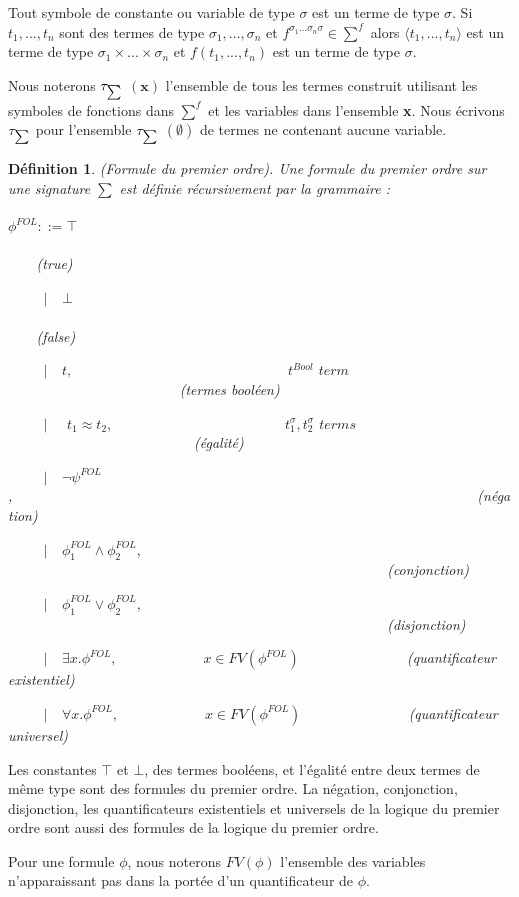 \documentclass[11pt,openany]{article}
\newtheorem{definition}{D\'efinition}[subsection]
\begin{document}
	Tout symbole de constante ou variable de type $\sigma$ est un terme de type $\sigma$. Si $t_{1},...,t_{n}$ sont des termes de type $\sigma_{1},...,\sigma_{n}$ et $f^{\sigma_{1} ...\sigma_{n} \sigma} \in \sum^{f}$ alors $\langle t_{1},...,t_{n}\rangle$ est un terme de type $\sigma_{1} \times ... \times \sigma_{n}$ et $f(t_{1},...,t_{n})$ est un terme de type $\sigma$.\par

Nous noterons $\tau_{\mathsmaller\sum}$ $(\textbf{x})$ l'ensemble de tous les termes construit utilisant les symboles de fonctions dans $\sum^{f}$ et les variables dans l'ensemble \textbf{x}. Nous \'ecrivons $\tau_{\mathsmaller\sum}$ pour l'ensemble $\tau_{\mathsmaller\sum}$ $(\emptyset)$ de termes ne contenant aucune variable.
\begin{definition} 
(Formule du premier ordre). Une formule du premier ordre sur une signature $\sum$ est d\'efinie r\'ecursivement par la grammaire :\\
\\$\phi^{FOL} ::= \top$~~~~~~~~~~~~~~~~~~~~~~~~~~~~~~~~~~~~~~~~~~~~~~~~~~~~~~~~~~~~~~~~~~~~~~~~~~(true)\par
~~~~~$|$~~$\bot$~~~~~~~~~~~~~~~~~~~~~~~~~~~~~~~~~~~~~~~~~~~~~~~~~~~~~~~~~~~~~~~~~~~~~~~~~~(false)
\par
~~~~~$|$~~$t,$~~~~~~~~~~~~~~~~~~~~~~~~~~~~~~$t^{Bool}$ $term$~~~~~~~~~~~~~~~~~~~~~~~~(termes bool\'een)\par
~~~~~$|$~~ $t_{1} \approx t_{2},$~~~~~~~~~~~~~~~~~~~~~~~~$t_{1}^{\sigma},t_{2}^{\sigma}$ $terms$~~~~~~~~~~~~~~~~~~~~~~~~~~(\'egalit\'e)\par
~~~~~$|$~~$\neg\psi^{FOL}$,~~~~~~~~~~~~~~~~~~~~~~~~~~~~~~~~~~~~~~~~~~~~~~~~~~~~~~~~~~~~~~~~~(n\'egation)\par
~~~~~$|$~~$\phi_{1}^{FOL} \land \phi_{2}^{FOL},$~~~~~~~~~~~~~~~~~~~~~~~~~~~~~~~~~~~~~~~~~~~~~~~~~~~~~(conjonction)\par
~~~~~$|$~~$\phi_{1}^{FOL} \lor \phi_{2}^{FOL},$~~~~~~~~~~~~~~~~~~~~~~~~~~~~~~~~~~~~~~~~~~~~~~~~~~~~~(disjonction)\par
~~~~~$|$~~$\exists x.\phi^{FOL},$~~~~~~~~~~~~$x\in FV(\phi^{FOL})$~~~~~~~~~~~~~~~(quantificateur existentiel)\par
~~~~~$|$~~$\forall x.\phi^{FOL},$~~~~~~~~~~~~$x\in FV(\phi^{FOL})$~~~~~~~~~~~~~~~(quantificateur universel)
\end{definition}
Les constantes $\top$ et $\bot$, des termes bool\'eens, et l'\'egalit\'e entre deux termes de m\^eme type sont des formules du premier ordre. La n\'egation, conjonction, disjonction, les quantificateurs existentiels et universels de la logique du premier ordre sont aussi des formules de la logique du premier ordre.\par
	Pour une formule $\phi$, nous noterons $FV(\phi)$ l'ensemble des variables n'apparaissant pas dans la port\'ee d'un quantificateur de $\phi$.
\end{document}
